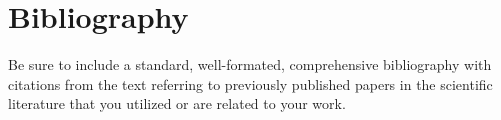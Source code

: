 \documentclass[11pt]{article}
\begin{document}
\section*{Bibliography}
Be sure to include a standard, well-formated, comprehensive bibliography with citations from the text referring to previously published papers in the scientific literature that you utilized or are related to your work.
%
%
\end{document}
